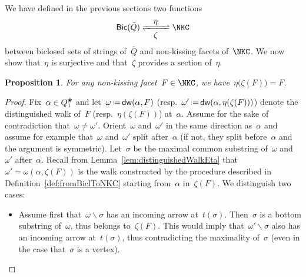 \documentclass{amsart}
\newtheorem{proposition}[theorem]{Proposition}
\theoremstyle{definition}
\newcommand{\ssm}{\smallsetminus} %
\newcommand{\eqdef}{\mbox{\,\raisebox{0.2ex}{\scriptsize\ensuremath{\mathrm:}}\ensuremath{=}\,}} %
\newcommand{\blossom}{^\text{\ding{96}}} %
\newcommand{\distinguishedWalk}[2]{\mathsf{dw}(#1,#2)} %
\newcommand{\Bicl}[1]{\mathsf{Bic}(#1)} %
\begin{document}
\enlargethispage{.4cm}
We have defined in the previous sections two functions
\[
\Bicl{\bar Q} \xrightleftharpoons[\quad\mbox{$\zeta$}\;\quad]{\mbox{$\eta$}} \NKC
\]
between biclosed sets of strings of~$\bar Q$ and non-kissing facets of~$\NKC$.
We now show that~$\eta$ is surjective and that~$\zeta$ provides a section of~$\eta$.

\begin{proposition}
\label{prop:surjection}
For any non-kissing facet~$F \in \NKC$, we have~$\eta \big( \zeta(F) \big) = F$.
\end{proposition}

\begin{proof}
Fix~$\alpha \in Q_1\blossom$ and let~$\omega \eqdef \distinguishedWalk{\alpha}{F}$ (resp.~$\omega' \eqdef \distinguishedWalk{\alpha}{\eta(\zeta(F))}$) denote the distinguished walk of~$F$ (resp.~$\eta(\zeta(F))$) at~$\alpha$.
Assume for the sake of contradiction that~$\omega \ne \omega'$.
Orient~$\omega$ and~$\omega'$ in the same direction as~$\alpha$ and assume for example that~$\omega$ and~$\omega'$ split after~$\alpha$ (if not, they split before~$\alpha$ and the argument is symmetric).
Let~$\sigma$ be the maximal common substring of~$\omega$ and~$\omega'$ after~$\alpha$.
Recall from Lemma~\ref{lem:distinguishedWalkEta} that~$\omega' = \omega(\alpha, \zeta(F))$ is the walk constructed by the procedure described in Definition~\ref{def:fromBiclToNKC} starting from~$\alpha$ in~$\zeta(F)$.
We distinguish two cases:
\begin{itemize}
\item Assume first that~$\omega \ssm \sigma$ has an incoming arrow at~$t(\sigma)$. Then~$\sigma$ is a bottom substring of~$\omega$, thus belongs to~$\zeta(F)$. This would imply that~$\omega' \ssm \sigma$ also has an incoming arrow at~$t(\sigma)$, thus contradicting the maximality of~$\sigma$ (even in the case that~$\sigma$ is a vertex).

\end{itemize}
\end{proof}
\end{document}
